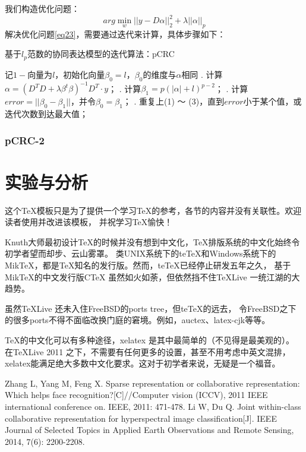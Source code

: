 \documentclass[12pt,a4paper]{article}
\begin{document}
我们构造优化问题：
\begin{equation}
\label{eq23}
arg \min_{w} ||y - D\alpha||_{2}^{2} + \lambda ||\alpha||_{p}
\end{equation}
解决优化问题\eqref{eq23}，需要通过迭代来计算，具体步骤如下：
\begin{algorithm}[H] 
	\caption{$基于l_{p}范数的协同表达模型的迭代算法$：pCRC}  
	\label{alg:pCRC}  
	\begin{algorithmic}
		\STATE 记$1-$向量为$l，$初始化向量$\beta_{0} = l$，$\beta_{0}$的维度与$\alpha$相同
		. 计算$\alpha = (D^{T}D + \lambda \beta^{t}\beta)^{-1}D^{T} \cdot y$；   
		. 计算$\beta_{1} = p(|\alpha| + l)^{p - 2}$；
		. 计算$error = ||\beta_{0} - \beta_{1}||$，并令$\beta_{0} = \beta_{1}$；
		. 重复上(1) ～ (3)，直到$error$小于某个值，或迭代次数到达最大值；
	\end{algorithmic}  
\end{algorithm}  

\subsubsection{pCRC-2}

\section{实验与分析}
这个\TeX 模板只是为了提供一个学习\TeX 的参考，各节的内容并没有关联性。欢迎读者使用并改进该模板，
并祝学习\TeX 愉快！

Knuth大师最初设计\TeX 的时候并没有想到中文化，\TeX 排版系统的中文化始终令初学者望而却步、云山雾罩。
类UNIX系统下的teTeX和Windows系统下的MikTeX，都是\TeX 知名的发行版。然而，teTeX已经停止研发五年之久，
基于MikTeX的中文发行版CTeX 虽然如火如荼，但依然挡不住\TeX Live 一统江湖的大趋势。

虽然\TeX Live 还未入住FreeBSD的ports tree，但teTeX的远去，
令FreeBSD之下的很多ports不得不面临改换门庭的窘境。例如，auctex、latex-cjk等等。


\TeX 的中文化可以有多种途径，xelatex 是其中最简单的（不见得是最美观的）。
在\TeX Live 2011 之下，不需要有任何更多的设置，甚至不用考虑中英文混排，
xelatex能满足绝大多数中文化要求。这对于初学者来说，无疑是一个福音。


\begin{thebibliography}{}
 Zhang L, Yang M, Feng X. Sparse representation or collaborative representation: Which helps face recognition?[C]//Computer vision (ICCV), 2011 IEEE international conference on. IEEE, 2011: 471-478.
Li W, Du Q. Joint within-class collaborative representation for hyperspectral image classification[J]. IEEE Journal of Selected Topics in Applied Earth Observations and Remote Sensing, 2014, 7(6): 2200-2208.
\end{thebibliography}
\clearpage
\end{document}
